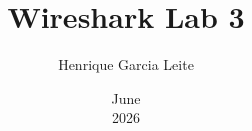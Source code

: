 \documentclass[a4paper, answers]{exam}
\title{Wireshark Lab 3}
\author{Henrique Garcia Leite}
\date{June\\2026}
\begin{document}
\begin{titlepage}
    \maketitle
\end{titlepage}



\end{document}
